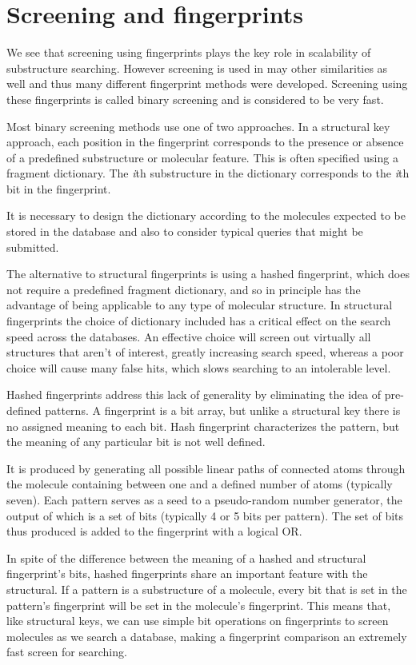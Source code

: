 \documentclass[thesis=M,english]{FITthesis}[2012/10/20]
\begin{document}
\section{Screening and fingerprints}
\label{screeningRef}
We see that screening using fingerprints plays the key role in scalability of substructure searching. However screening is used in may other similarities as well and thus many different fingerprint methods were developed. Screening using these fingerprints is called binary screening and is considered to be very fast.

Most binary screening methods use one of two approaches. In a structural key approach, each position in the fingerprint corresponds to the presence or absence of a predefined substructure or molecular feature. This is often specified using a fragment dictionary. The \textit{i}th substructure in the dictionary corresponds to the \textit{i}th bit in the fingerprint. 

It is necessary to design the dictionary according to the molecules expected to be stored in the database and also to consider typical queries that might be submitted.

The alternative to structural fingerprints is using a hashed fingerprint, which does not require a predefined fragment dictionary, and so in principle has the advantage of being applicable to any type of molecular structure. In structural fingerprints the choice of dictionary included has a critical effect on the search speed across the databases. An effective choice will screen out virtually all structures that aren't of interest, greatly increasing search speed, whereas a poor choice will cause many false hits, which slows searching to an intolerable level. 

Hashed fingerprints address this lack of generality by eliminating the idea of pre-defined patterns. A fingerprint is a bit array, but unlike a structural key there is no assigned meaning to each bit. Hash fingerprint characterizes the pattern, but the meaning of any particular bit is not well defined. 

It is produced by generating all possible linear paths of connected atoms through the molecule containing between one and a defined number of atoms (typically seven). Each pattern serves as a seed to a pseudo-random number generator, the output of which is a set of bits (typically 4 or 5 bits per pattern). The set of bits thus produced is added to the fingerprint with a logical OR.\cite{daylight}

In spite of the difference between the meaning of a hashed and structural fingerprint's bits, hashed fingerprints share an important feature with the structural. If a pattern is a substructure of a molecule, every bit that is set in the pattern's fingerprint will be set in the molecule's fingerprint. This means that, like structural keys, we can use simple bit operations on fingerprints to screen molecules as we search a database, making a fingerprint comparison an extremely fast screen for searching.\cite{daylight}
\end{document}
